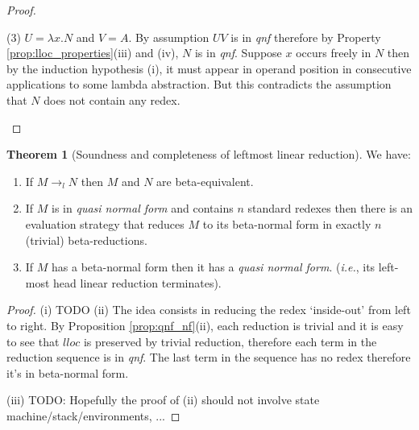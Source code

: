 \documentclass{article}
\makeatletter
\theoremstyle{definition}
\newtheorem{theorem}{Theorem}[section]
\renewcommand\ie{{\it i.e.\@\xspace}}
\makeatother
\begin{document}
\begin{proof}
\begin{compactitem}
\begin{compactitem}
  \item[(3)] $U = \lambda x . N$ and $V = A$.
  By assumption $UV$ is in \emph{qnf} therefore by Property \ref{prop:lloc_properties}(iii) and (iv), $N$ is in \emph{qnf}.
  Suppose $x$ occurs freely in $N$ then by the induction hypothesis (i), it must appear in operand position in consecutive applications to some lambda abstraction. But this contradicts the assumption that $N$ does not contain any redex.
\end{compactitem}
\end{compactitem}
\end{proof}

\begin{theorem}[Soundness and completeness of leftmost linear reduction]
\label{thm:soundness_leftmostlinearred}
We have:
\begin{enumerate}[label=(\roman*)]
\item If $M \rightarrow_{l} N$ then $M$ and $N$ are beta-equivalent.
\item If $M$ is in \emph{quasi normal form} and contains $n$ standard redexes then there is an evaluation strategy that reduces $M$ to its beta-normal form in exactly $n$ (trivial) beta-reductions.
\item If $M$ has a beta-normal form then it has a \emph{quasi normal form}. (\ie, its left-most head linear reduction terminates).
\end{enumerate}
\end{theorem}
\begin{proof}
(i) TODO
(ii) The idea consists in reducing the redex `inside-out' from left to right. By Proposition \ref{prop:qnf_nf}(ii), each reduction is trivial and it is easy to see that  $lloc$ is preserved by trivial reduction, therefore each term in the reduction sequence is in \emph{qnf}. The last term in the sequence has no redex therefore it's in beta-normal form.

(iii) TODO: Hopefully the proof of (ii) should not involve state machine/stack/environments, ...
\end{proof}
\end{document}
